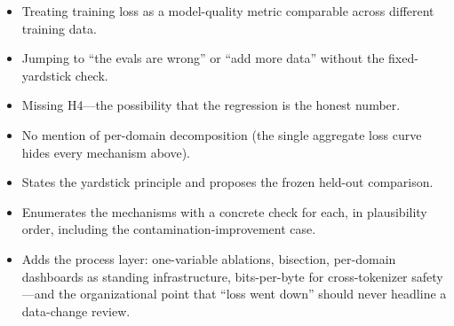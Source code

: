 \begin{interviewq}
\redflags
\begin{itemize}
    \item Treating training loss as a model-quality metric comparable across different training data.
    \item Jumping to ``the evals are wrong'' or ``add more data'' without the fixed-yardstick check.
    \item Missing H4---the possibility that the regression is the honest number.
    \item No mention of per-domain decomposition (the single aggregate loss curve hides every mechanism above).
\end{itemize}


\goodgreat
\begin{itemize}
    \item {} States the yardstick principle and proposes the frozen held-out comparison.
    \item {} Enumerates the mechanisms with a concrete check for each, in plausibility order, including the contamination-improvement case.
    \item {} Adds the process layer: one-variable ablations, bisection, per-domain dashboards as standing infrastructure, bits-per-byte for cross-tokenizer safety---and the organizational point that ``loss went down'' should never headline a data-change review.
\end{itemize}

\end{interviewq}

\medskip

